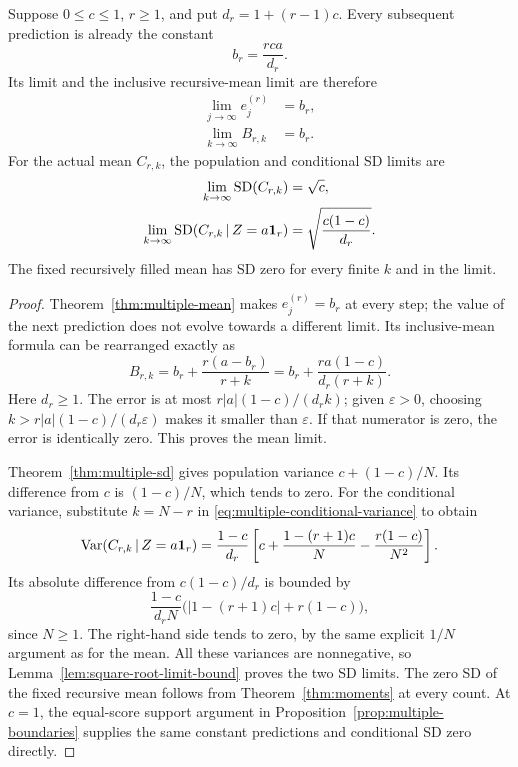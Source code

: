 \begin{theorem}
\label{thm:prediction-limits}
Suppose \(0\leq c\leq1\), \(r\geq1\), and put
\(d_r=1+(r-1)c\). Every subsequent prediction is already the constant
\[
 b_r=\frac{rca}{d_r}.
\]
Its limit and the inclusive recursive-mean limit are therefore
\begin{align}
 \lim_{j\to\infty}e_j^{(r)}&=b_r,
     \label{eq:limit-next-standardized}\\
 \lim_{k\to\infty}B_{r,k}&=b_r.
     \label{eq:limit-inclusive-standardized}
\end{align}
For the actual mean \(C_{r,k}\), the population and conditional SD limits
are
\begin{align}
 \lim_{k\to\infty}\operatorname{SD}(C_{r,k})
   &=\sqrt c,
     \label{eq:limit-population-sd}\\
 \lim_{k\to\infty}\operatorname{SD}(C_{r,k}\,\vert\, Z=a\mathbf{1}_r)
   &=\sqrt{\frac{c(1-c)}{d_r}}.
     \label{eq:limit-conditional-sd}
\end{align}
The fixed recursively filled mean has SD zero for every finite \(k\) and
in the limit.
\end{theorem}
\begin{proof}
Theorem~\ref{thm:multiple-mean} makes \(e_j^{(r)}=b_r\) at every step;
the value of the next prediction does not evolve towards a different
limit. Its inclusive-mean formula can be rearranged exactly as
\begin{equation}
 B_{r,k}
  =b_r+\frac{r(a-b_r)}{r+k}
  =b_r+\frac{ra(1-c)}{d_r(r+k)}.
  \label{eq:mean-limit-error}
\end{equation}
Here \(d_r\geq1\). The error is at most
\(r|a|(1-c)/(d_r k)\); given \(\varepsilon>0\), choosing
\(k>r|a|(1-c)/(d_r\varepsilon)\) makes it smaller than
\(\varepsilon\). If that numerator is zero, the error is identically
zero. This proves the mean limit.

Theorem~\ref{thm:multiple-sd} gives population variance
\(c+(1-c)/N\). Its difference from \(c\) is
\((1-c)/N\), which tends to zero. For the conditional variance, substitute
\(k=N-r\) in \eqref{eq:multiple-conditional-variance} to obtain
\begin{equation}
 \operatorname{Var}(C_{r,k}\,\vert\, Z=a\mathbf{1}_r)
 =\frac{1-c}{d_r}
  \left[c+\frac{1-(r+1)c}{N}-\frac{r(1-c)}{N^2}\right].
 \label{eq:conditional-variance-limit-expansion}
\end{equation}
Its absolute difference from \(c(1-c)/d_r\) is bounded by
\[
 \frac{1-c}{d_r N}
   \bigl(|1-(r+1)c|+r(1-c)\bigr),
\]
since \(N\geq1\). The right-hand side tends to zero, by the same
explicit \(1/N\) argument as for the mean. All these variances are
nonnegative, so Lemma~\ref{lem:square-root-limit-bound} proves the two SD
limits. The zero SD of the fixed recursive mean follows from
Theorem~\ref{thm:moments} at every count. At \(c=1\), the equal-score
support argument in Proposition~\ref{prop:multiple-boundaries} supplies
the same constant predictions and conditional SD zero directly.
\end{proof}

